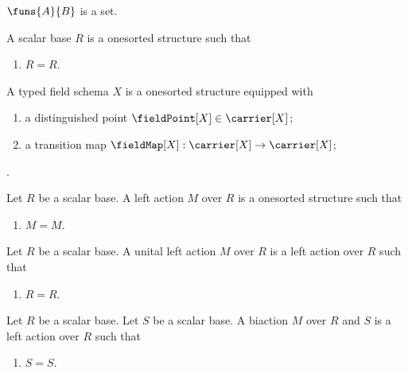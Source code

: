 \begin{signature}\label{parameterized_funs}
    $\funs{A}{B}$ is a set.
\end{signature}

\begin{struct}\label{scalar_base}
    A scalar base $R$ is a onesorted structure such that
    \begin{enumerate}
        \item\label{scalar_base_refl} $R=R$.
    \end{enumerate}
\end{struct}

\begin{struct}\label{typed_field_schema}
    A typed field schema $X$ is a onesorted structure equipped with
    \begin{enumerate}
        \item\label{typed_field_point}
            a distinguished point
            $\fieldPoint[X]\in\carrier[X]$;
        \item\label{typed_field_map}
            a transition map
            $\fieldMap[X]:\carrier[X]\to\carrier[X]$;
    \end{enumerate}
    .
\end{struct}

\begin{struct}\label{left_action}
    Let $R$ be a scalar base.
    A left action $M$ over $R$ is a onesorted structure such that
    \begin{enumerate}
        \item\label{left_action_refl} $M=M$.
    \end{enumerate}
\end{struct}

\begin{struct}\label{unital_left_action}
    Let $R$ be a scalar base.
    A unital left action $M$ over $R$ is a left action over $R$ such that
    \begin{enumerate}
        \item\label{unital_left_action_refl} $R=R$.
    \end{enumerate}
\end{struct}

\begin{struct}\label{biaction}
    Let $R$ be a scalar base.
    Let $S$ be a scalar base.
    A biaction $M$ over $R$ and $S$ is a left action over $R$ such that
    \begin{enumerate}
        \item\label{biaction_refl} $S=S$.
    \end{enumerate}
\end{struct}

